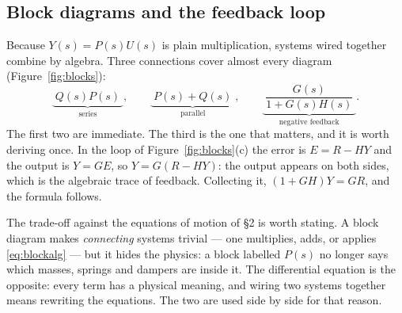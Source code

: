 \documentclass[11pt]{article}
\begin{document}
\subsection{Block diagrams and the feedback loop}\label{sec:blocks}
Because $Y(s)=P(s)U(s)$ is plain multiplication, systems wired together combine by
algebra. Three connections cover almost every diagram (Figure~\ref{fig:blocks}):
\begin{equation}\label{eq:blockalg}
   \underbrace{\;Q(s)P(s)\;}_{\text{series}},
   \qquad
   \underbrace{\;P(s)+Q(s)\;}_{\text{parallel}},
   \qquad
   \underbrace{\;\frac{G(s)}{1+G(s)H(s)}\;}_{\text{negative feedback}} .
\end{equation}
The first two are immediate. The third is the one that matters, and it is worth
deriving once. In the loop of Figure~\ref{fig:blocks}(c) the error is
$E=R-HY$ and the output is $Y=GE$, so $Y=G(R-HY)$: the output appears on both
sides, which is the algebraic trace of feedback. Collecting it,
$(1+GH)Y=GR$, and the formula follows.

The trade-off against the equations of motion of \S2 is worth stating. A block
diagram makes \emph{connecting} systems trivial --- one multiplies, adds, or applies
\eqref{eq:blockalg} --- but it hides the physics: a block labelled $P(s)$ no longer
says which masses, springs and dampers are inside it. The differential equation is
the opposite: every term has a physical meaning, and wiring two systems together
means rewriting the equations. The two are used side by side for that reason.
\end{document}
